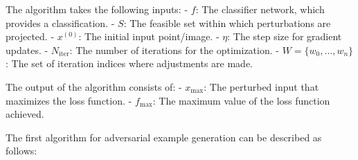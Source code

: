 
The algorithm takes the following inputs:
- $f$: The classifier network, which provides a classification.
- $S$: The feasible set within which perturbations are projected.
- $x^{(0)}$: The initial input point/image.
- $\eta$: The step size for gradient updates.
- $N_{\text{iter}}$: The number of iterations for the optimization.
- $W = \{w_0, \ldots, w_n\}$: The set of iteration indices where adjustments are made.

The output of the algorithm consists of:
- $x_{\text{max}}$: The perturbed input that maximizes the loss function.
- $f_{\text{max}}$: The maximum value of the loss function achieved.

The first algorithm for adversarial example generation can be described as follows:

